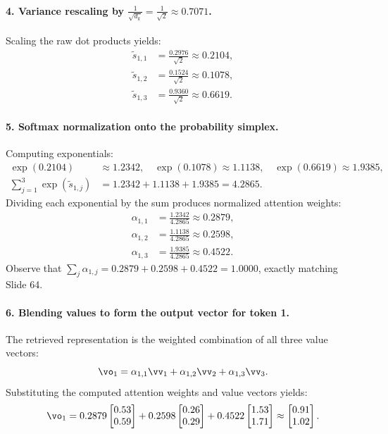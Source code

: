 \documentclass[../../main.tex]{subfiles}
\begin{document}
\begin{examinsight}
\paragraph{4. Variance rescaling by $\frac{1}{\sqrt{d_k}} = \frac{1}{\sqrt{2}} \approx 0.7071$.}
Scaling the raw dot products yields:
\begin{align}
\tilde{s}_{1,1} &= \frac{0.2976}{\sqrt{2}} \approx 0.2104, \\
\tilde{s}_{1,2} &= \frac{0.1524}{\sqrt{2}} \approx 0.1078, \\
\tilde{s}_{1,3} &= \frac{0.9360}{\sqrt{2}} \approx 0.6619.
\end{align}

\paragraph{5. Softmax normalization onto the probability simplex.}
Computing exponentials:
\begin{align}
\exp(0.2104) &\approx 1.2342, \quad \exp(0.1078) \approx 1.1138, \quad \exp(0.6619) \approx 1.9385, \\
\sum_{j=1}^3 \exp(\tilde{s}_{1,j}) &= 1.2342 + 1.1138 + 1.9385 = 4.2865.
\end{align}
Dividing each exponential by the sum produces normalized attention weights:
\begin{align}
\alpha_{1,1} &= \frac{1.2342}{4.2865} \approx 0.2879, \\
\alpha_{1,2} &= \frac{1.1138}{4.2865} \approx 0.2598, \\
\alpha_{1,3} &= \frac{1.9385}{4.2865} \approx 0.4522.
\end{align}
Observe that $\sum_j \alpha_{1,j} = 0.2879 + 0.2598 + 0.4522 = 1.0000$, exactly matching Slide 64.

\paragraph{6. Blending values to form the output vector for token 1.}
The retrieved representation is the weighted combination of all three value vectors:
\begin{equation}
\vo_1 = \alpha_{1,1}\vv_1 + \alpha_{1,2}\vv_2 + \alpha_{1,3}\vv_3.
\end{equation}
Substituting the computed attention weights and value vectors yields:
\begin{equation}
\vo_1 = 0.2879 \begin{bmatrix} 0.53 \\ 0.59 \end{bmatrix} + 0.2598 \begin{bmatrix} 0.26 \\ 0.29 \end{bmatrix} + 0.4522 \begin{bmatrix} 1.53 \\ 1.71 \end{bmatrix} \approx \begin{bmatrix} 0.91 \\ 1.02 \end{bmatrix}.
\end{equation}


\end{examinsight}
\end{document}
